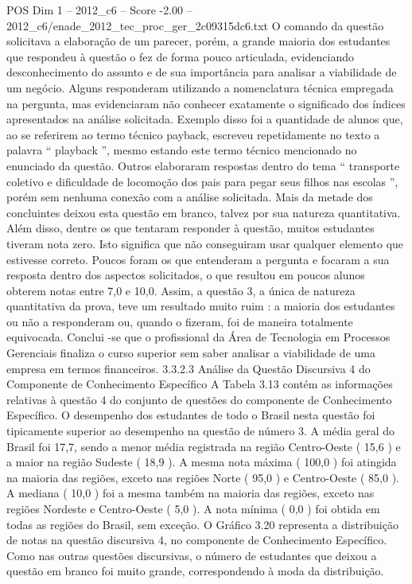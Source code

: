 \begin{textsample}{POS Dim 1 – 2012\_c6 – Score -2.00 – 2012\_c6/enade\_2012\_tec\_proc\_ger\_2c09315dc6.txt}
O comando da questão solicitava a elaboração de um parecer, porém, a grande maioria dos estudantes que respondeu à questão o fez de forma pouco articulada, evidenciando desconhecimento do assunto e de sua importância para analisar a viabilidade de um negócio.
Alguns responderam utilizando a nomenclatura técnica empregada na pergunta, mas evidenciaram não conhecer exatamente o significado dos índices apresentados na análise solicitada.
Exemplo disso foi a quantidade de alunos que, ao se referirem ao termo técnico payback, escreveu repetidamente no texto a palavra “ playback ”, mesmo estando este termo técnico mencionado no enunciado da questão.
Outros elaboraram respostas dentro do tema “ transporte coletivo e dificuldade de locomoção dos pais para pegar seus filhos nas escolas ”, porém sem nenhuma conexão com a análise solicitada.
Mais da metade dos concluintes deixou esta questão em branco, talvez por sua natureza quantitativa.
Além disso, dentre os que tentaram responder à questão, muitos estudantes tiveram nota zero.
Isto significa que não conseguiram usar qualquer elemento que estivesse correto.
Poucos foram os que entenderam a pergunta e focaram a sua resposta dentro dos aspectos solicitados, o que resultou em poucos alunos obterem notas entre 7,0 e 10,0.
Assim, a questão 3, a única de natureza quantitativa da prova, teve um resultado muito ruim : a maioria dos estudantes ou não a responderam ou, quando o fizeram, foi de maneira totalmente equivocada.
Conclui -se que o profissional da Área de Tecnologia em Processos Gerenciais finaliza o curso superior sem saber analisar a viabilidade de uma empresa em termos financeiros. 3.3.2.3 Análise da Questão Discursiva 4 do Componente de Conhecimento Específico A Tabela 3.13 contém as informações relativas à questão 4 do conjunto de questões do componente de Conhecimento Específico.
O desempenho dos estudantes de todo o Brasil nesta questão foi tipicamente superior ao desempenho na questão de número 3.
A média geral do Brasil foi 17,7, sendo a menor média registrada na região Centro-Oeste ( 15,6 ) e a maior na região Sudeste ( 18,9 ).
A mesma nota máxima ( 100,0 ) foi atingida na maioria das regiões, exceto nas regiões Norte ( 95,0 ) e Centro-Oeste ( 85,0 ).
A mediana ( 10,0 ) foi a mesma também na maioria das regiões, exceto nas regiões Nordeste e Centro-Oeste ( 5,0 ).
A nota mínima ( 0,0 ) foi obtida em todas as regiões do Brasil, sem exceção.
O Gráfico 3.20 representa a distribuição de notas na questão discursiva 4, no componente de Conhecimento Específico.
Como nas outras questões discursivas, o número de estudantes que deixou a questão em branco foi muito grande, correspondendo à moda da distribuição.

\end{textsample}
